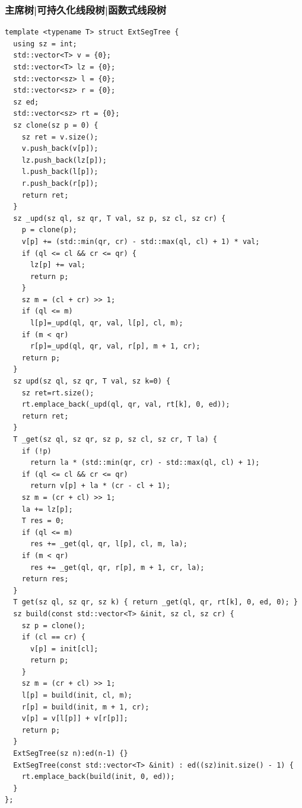 \documentclass[UTF8,twoside]{ctexart}
\begin{document}
\subsubsection{主席树|可持久化线段树|函数式线段树}
\begin{lstlisting}
template <typename T> struct ExtSegTree {
  using sz = int;
  std::vector<T> v = {0};
  std::vector<T> lz = {0};
  std::vector<sz> l = {0};
  std::vector<sz> r = {0};
  sz ed;
  std::vector<sz> rt = {0};
  sz clone(sz p = 0) {
    sz ret = v.size();
    v.push_back(v[p]);
    lz.push_back(lz[p]);
    l.push_back(l[p]);
    r.push_back(r[p]);
    return ret;
  }
  sz _upd(sz ql, sz qr, T val, sz p, sz cl, sz cr) {
    p = clone(p);
    v[p] += (std::min(qr, cr) - std::max(ql, cl) + 1) * val;
    if (ql <= cl && cr <= qr) {
      lz[p] += val;
      return p;
    }
    sz m = (cl + cr) >> 1;
    if (ql <= m)
      l[p]=_upd(ql, qr, val, l[p], cl, m);
    if (m < qr)
      r[p]=_upd(ql, qr, val, r[p], m + 1, cr);
    return p;
  }
  sz upd(sz ql, sz qr, T val, sz k=0) {
    sz ret=rt.size();
    rt.emplace_back(_upd(ql, qr, val, rt[k], 0, ed));
    return ret;
  }
  T _get(sz ql, sz qr, sz p, sz cl, sz cr, T la) {
    if (!p)
      return la * (std::min(qr, cr) - std::max(ql, cl) + 1);
    if (ql <= cl && cr <= qr)
      return v[p] + la * (cr - cl + 1);
    sz m = (cr + cl) >> 1;
    la += lz[p];
    T res = 0;
    if (ql <= m)
      res += _get(ql, qr, l[p], cl, m, la);
    if (m < qr)
      res += _get(ql, qr, r[p], m + 1, cr, la);
    return res;
  }
  T get(sz ql, sz qr, sz k) { return _get(ql, qr, rt[k], 0, ed, 0); }
  sz build(const std::vector<T> &init, sz cl, sz cr) {
    sz p = clone();
    if (cl == cr) {
      v[p] = init[cl];
      return p;
    }
    sz m = (cr + cl) >> 1;
    l[p] = build(init, cl, m);
    r[p] = build(init, m + 1, cr);
    v[p] = v[l[p]] + v[r[p]];
    return p;
  }
  ExtSegTree(sz n):ed(n-1) {}
  ExtSegTree(const std::vector<T> &init) : ed((sz)init.size() - 1) {
    rt.emplace_back(build(init, 0, ed));
  }
};

\end{lstlisting}
\end{document}
